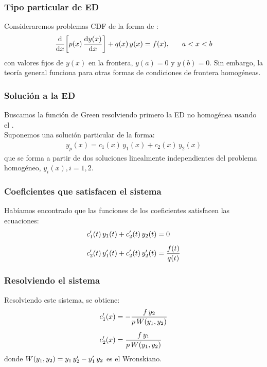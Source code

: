 \documentclass[12pt]{beamer}
\begin{document}
\begin{frame}
\frametitle{Tipo particular de ED}
Consideraremos problemas CDF de la forma de :
\pause
\begin{align}
\dv{x} \bigg[ p (x) \, \dv{y (x)}{x} \bigg] + q (x) \, y (x) = f (x), \hspace{0.6cm} a < x < b
\label{eq:ecuacion_07_25}
\end{align}
con valores fijos de $y (x)$ en la frontera, $y (a) = 0$ y $y (b) = 0$. \pause Sin embargo, la teoría general funciona para otras formas de condiciones de frontera homogéneas.
\end{frame}

\begin{frame}
\frametitle{Solución a la ED}
Buscamos la función de Green resolviendo primero la ED no homogénea usando el .
\\
\bigskip
\pause
Suponemos una solución particular de la forma:
\pause
\begin{align*}
y_{p} (x) = c_{1} (x) \, y_{1} (x) + c_{2} (x) \, y_{2} (x)
\end{align*}
que se forma a partir de dos soluciones linealmente independientes del problema homogéneo, $y_{i} (x), i = 1, 2$.
\end{frame}

\begin{frame}
\frametitle{Coeficientes que satisfacen el sistema}
Habíamos encontrado que las funciones de los coeficientes satisfacen las ecuaciones:
\pause
\begin{align}
\begin{aligned}[b]
{c}^{\prime}_{1} (t) \, y_{1} (t) + {c}^{\prime}_{2} (t) \, y_{2} (t) &= 0 \\[0.5em]
{c}^{\prime}_{2} (t) \, {y}^{\prime}_{1} (t) + {c}^{\prime}_{2} (t) \, {y}^{\prime}_{2} (t) &= \dfrac{f (t)}{q (t)}
\end{aligned}
\label{eq:ecuacion_07_26}
\end{align}
\end{frame}

\begin{frame}
\frametitle{Resolviendo el sistema}
Resolviendo este sistema, se obtiene:
\pause
\begin{align*}
{c}^{\prime}_{1} (x) &= - \dfrac{f \, y_{2}}{p \, W (y_{1}, y_{2})} \\[0.5em]
{c}^{\prime}_{2} (x) &= \dfrac{f \, y_{1}}{p \, W (y_{1}, y_{2})}
\end{align*}
donde $W (y_{1}, y_{2}) = y_{1} \, {y}^{\prime}_{2} - {y}^{\prime}_{1} \, y_{2}$ es el Wronskiano.
\end{frame}
\end{document}

